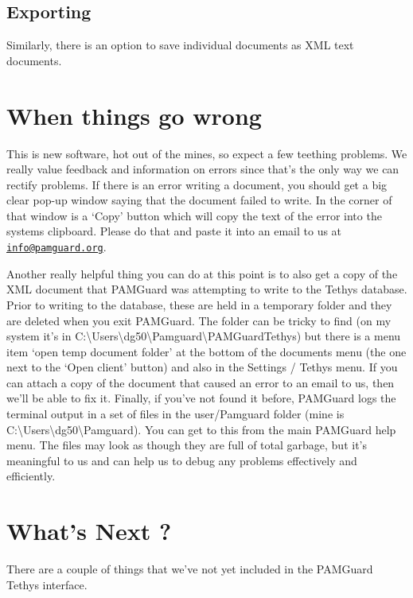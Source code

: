\documentclass[
]{article}
\begin{document}
\subsection{Exporting}\label{exporting}

Similarly, there is an option to save individual documents as XML text
documents.

\section{When things go wrong}\label{when-things-go-wrong}

This is new software, hot out of the mines, so expect a few teething
problems. We really value feedback and information on errors since
that's the only way we can rectify problems. If there is an error
writing a document, you should get a big clear pop-up window saying that
the document failed to write. In the corner of that window is a `Copy'
button which will copy the text of the error into the systems clipboard.
Please do that and paste it into an email to us at
\href{mailto:info@pamguard.org}{\nolinkurl{info@pamguard.org}}.

Another really helpful thing you can do at this point is to also get a
copy of the XML document that PAMGuard was attempting to write to the
Tethys database. Prior to writing to the database, these are held in a
temporary folder and they are deleted when you exit PAMGuard. The folder
can be tricky to find (on my system it's in
C:\textbackslash Users\textbackslash dg50\textbackslash Pamguard\textbackslash PAMGuardTethys)
but there is a menu item `open temp document folder' at the bottom of
the documents menu (the one next to the `Open client' button) and also
in the Settings / Tethys menu. If you can attach a copy of the document
that caused an error to an email to us, then we'll be able to fix it.
Finally, if you've not found it before, PAMGuard logs the terminal
output in a set of files in the user/Pamguard folder (mine is
C:\textbackslash Users\textbackslash dg50\textbackslash Pamguard). You
can get to this from the main PAMGuard help menu. The files may look as
though they are full of total garbage, but it's meaningful to us and can
help us to debug any problems effectively and efficiently.

\section{What's Next ?}\label{whats-next}

There are a couple of things that we've not yet included in the PAMGuard
Tethys interface.
\end{document}
